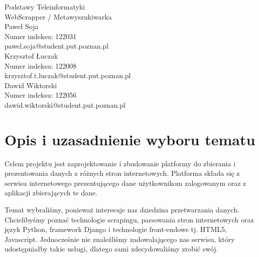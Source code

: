 \documentclass[12pt, titlepage]{article}
\begin{document}
	\begin{titlepage}
		\thispagestyle{firstpage}
		\centering
			\vspace*{5cm}
			{\huge Podstawy Teleinformatyki\\
				WebScrapper / Metawyszukiwarka\\}
			\vspace{7cm}
			{\large
			Paweł Soja\\
			Numer indeksu: 122031\\
			pawel.soja@student.put.poznan.pl\\
			\vspace{0.5cm}
			Krzysztof Łuczak\\
			Numer indeksu: 122008\\
			krzysztof.t.luczak@student.put.poznan.pl\\
			\vspace{0.5cm}
			Dawid Wiktorski\\
			Numer indeksu: 122056\\
			dawid.wiktorski@student.put.poznan.pl\\}
	\end{titlepage}
	\tableofcontents
	
	\newpage
	\section{Opis i uzasadnienie wyboru tematu}
	Celem projektu jest zaprojektowanie i zbudowanie platformy do zbierania i prezentowania danych z różnych stron internetowych. Platforma składa się z serwisu internetowego prezentującego dane użytkownikom zalogowanym oraz z aplikacji zbierających te dane.
	
	Temat wybraliśmy, ponieważ interesuje nas dziedzina przetwarzania danych. Chcielibyśmy poznać technologie scrapingu, parsowania stron internetowych oraz język Python, framework Django i technologie front-endowe tj. HTML5, Javascript. Jednocześnie nie znaleźliśmy zadowalającego nas serwisu, który udostępniałby takie usługi, dlatego sami zdecydowaliśmy zrobić swój.
\end{document}
